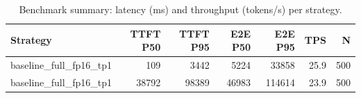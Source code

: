 \begin{table}
\caption{Benchmark summary: latency (ms) and throughput (tokens/s) per strategy.}
\label{tab:summary}
\begin{tabular}{lrrrrrr}
\toprule
Strategy & TTFT P50 & TTFT P95 & E2E P50 & E2E P95 & TPS & N \\
\midrule
baseline_full_fp16_tp1 & 109 & 3442 & 5224 & 33858 & 25.9 & 500 \\
baseline_full_fp16_tp1 & 38792 & 98389 & 46983 & 114614 & 23.9 & 500 \\
\bottomrule
\end{tabular}
\end{table}
